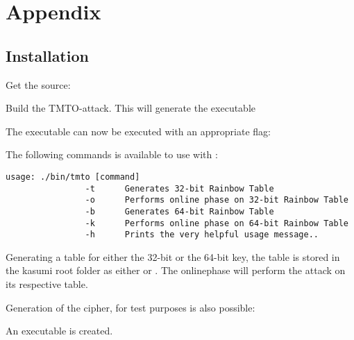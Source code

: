 \chapter{Appendix}
\section{Installation}
Get the source:

\quad{}

Build the TMTO-attack. This will generate the executable

\quad{}

The executable  can now be executed with an appropriate
flag:

\quad{}

The following commands is available to use with :
\begin{verbatim}
usage: ./bin/tmto [command] 
                -t      Generates 32-bit Rainbow Table 
                -o      Performs online phase on 32-bit Rainbow Table 
                -b      Generates 64-bit Rainbow Table 
                -k      Performs online phase on 64-bit Rainbow Table 
                -h      Prints the very helpful usage message.. 
\end{verbatim}

Generating a table for either the 32-bit or the 64-bit key, the table
is stored in the kasumi root folder as either  or
. The onlinephase will perform the attack on its
respective table.

Generation of the cipher, for test purposes is also possible:

\quad{}

An executable  is created. 

